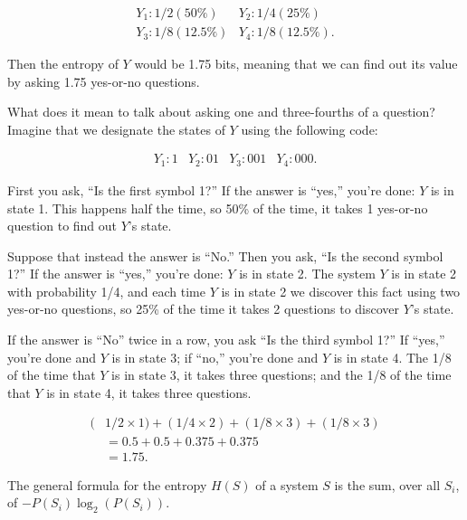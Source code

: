 {\begin{equation*}
  \begin{array}{ll}
 Y_{1} : 1/2 (50\%) &  Y_{2} : 1/4 (25\%)\\
 Y_{3} : 1/8 (12.5\%) &  Y_{4} : 1/8 (12.5\%).
  \end{array}
\end{equation*}



 Then the entropy of $Y$ would be 1.75 bits, meaning that we can find
out its value by asking 1.75 yes-or-no questions.


 What does it mean to talk about asking one and three-fourths of a
question? Imagine that we designate the states of $Y$ using the following
code:

\begin{equation*}
  \begin{array}{llll}
 Y_{1} : 1 &  Y_{2} : 01 &  Y_{3} : 001 &  Y_{4} : 000.
  \end{array}
\end{equation*}



 First you ask, ``Is the first symbol
1?'' If the answer is
``yes,'' you're
done: $Y$ is in state 1. This happens half the time, so 50\% of the time,
it takes 1 yes-or-no question to find out $Y$'s state.


 Suppose that instead the answer is
``No.'' Then you ask,
``Is the second symbol 1?'' If the
answer is ``yes,''
you're done: $Y$ is in state 2. The system $Y$ is in state
2 with probability 1/4, and each time $Y$ is in state 2 we discover this
fact using two yes-or-no questions, so 25\% of the time it takes 2
questions to discover $Y$'s state.


 If the answer is ``No'' twice
in a row, you ask ``Is the third symbol
1?'' If ``yes,''
you're done and $Y$ is in state 3; if
``no,'' you're done
and $Y$ is in state 4. The 1/8 of the time that $Y$ is in state 3, it takes
three questions; and the 1/8 of the time that $Y$ is in state 4, it takes
three questions.

\begin{align*}
 (&1/2 \times 1) + (1/4 \times 2) + (1/8 \times 3) + (1/8 \times 3) \\
  &= 0.5 + 0.5 + 0.375 + 0.375 \\
 &= 1.75.
\end{align*}


 The general formula for the entropy $H(S)$ of a system $S$ is the sum,
over all $S_{i}$, of
$-P(S_{i})\log_{2}(P(S_{i}))$.


}

